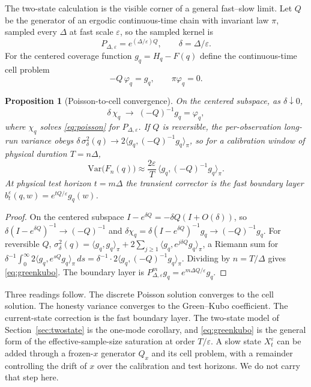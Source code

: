 \documentclass[11pt]{article}
\newtheorem{proposition}[theorem]{Proposition}
\theoremstyle{definition}
\theoremstyle{remark}
\newcommand{\Var}{\mathrm{Var}}
\begin{document}
The two-state calculation is the visible corner of a general fast--slow limit. Let $Q$ be the
generator of an ergodic continuous-time chain with invariant law $\pi$, sampled every
$\Delta$ at fast scale $\varepsilon$, so the sampled kernel is
\begin{equation}\label{eq:sampled}
  P_{\Delta,\varepsilon} = e^{(\Delta/\varepsilon)Q},
  \qquad \delta = \Delta/\varepsilon .
\end{equation}
For the centered coverage function $g_q=H_q-F(q)$ define the continuous-time cell problem
\begin{equation}\label{eq:cell}
  -Q\,\varphi_q = g_q, \qquad \pi\varphi_q = 0 .
\end{equation}

\begin{proposition}[Poisson-to-cell convergence]\label{prop:homog}
On the centered subspace, as $\delta\downarrow0$,
\begin{equation}\label{eq:homlim}
  \delta\,\chi_q \;\longrightarrow\; (-Q)^{-1}g_q = \varphi_q ,
\end{equation}
where $\chi_q$ solves \eqref{eq:poisson} for $P_{\Delta,\varepsilon}$. If $Q$ is reversible,
the per-observation long-run variance obeys $\delta\,\sigma^2_\delta(q)\to
2\langle g_q,(-Q)^{-1}g_q\rangle_\pi$, so for a calibration window of physical duration
$T=n\Delta$,
\begin{equation}\label{eq:greenkubo}
  \Var\big(F_n(q)\big) \approx \frac{2\varepsilon}{T}\,\langle g_q,(-Q)^{-1}g_q\rangle_\pi .
\end{equation}
At physical test horizon $t=m\Delta$ the transient corrector is the fast boundary layer
$b^\varepsilon_t(q,w) = e^{tQ/\varepsilon}g_q(w)$.
\end{proposition}

\begin{proof}
On the centered subspace $I-e^{\delta Q}=-\delta Q(I+O(\delta))$, so
$\delta(I-e^{\delta Q})^{-1}\to(-Q)^{-1}$ and $\delta\chi_q=\delta(I-e^{\delta Q})^{-1}g_q
\to(-Q)^{-1}g_q$. For reversible $Q$, $\sigma^2_\delta(q)=\langle g_q,g_q\rangle_\pi+2\sum_{j
\ge1}\langle g_q,e^{j\delta Q}g_q\rangle_\pi$, a Riemann sum for $\delta^{-1}\int_0^\infty
2\langle g_q,e^{sQ}g_q\rangle_\pi\,ds=\delta^{-1}\cdot2\langle g_q,(-Q)^{-1}g_q\rangle_\pi$.
Dividing by $n=T/\Delta$ gives \eqref{eq:greenkubo}. The boundary layer is
$P^m_{\Delta,\varepsilon}g_q=e^{m\Delta Q/\varepsilon}g_q$.
\end{proof}

Three readings follow. The discrete Poisson solution converges to the cell solution. The
honesty variance converges to the Green--Kubo coefficient. The current-state correction is
the fast boundary layer. The two-state model of Section~\ref{sec:twostate} is the one-mode
corollary, and \eqref{eq:greenkubo} is the general form of the effective-sample-size
saturation at order $T/\varepsilon$. A slow state $X^\varepsilon_t$ can be added through a
frozen-$x$ generator $Q_x$ and its cell problem, with a remainder controlling the drift of
$x$ over the calibration and test horizons. We do not carry that step here.
\end{document}
